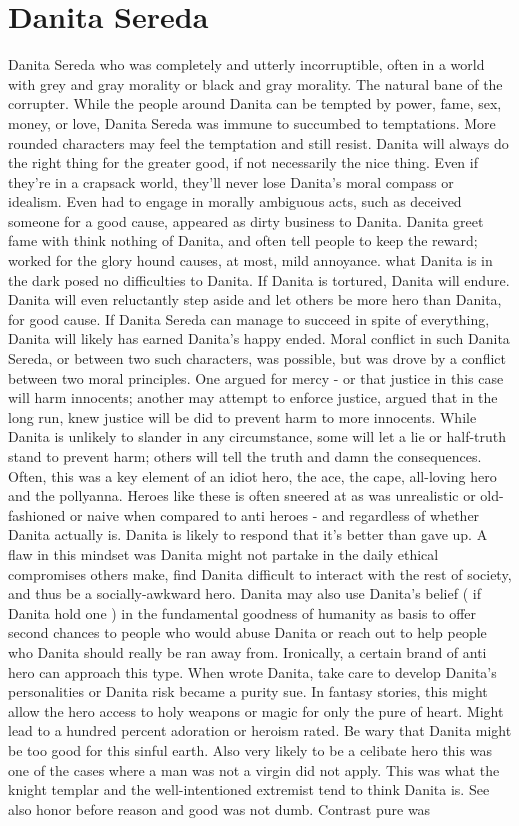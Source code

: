 \documentclass[12pt]{book}
\begin{document}
\chapter{Danita Sereda}

Danita Sereda who was completely and utterly incorruptible, often in a world with grey and gray morality or black and gray morality. The natural bane of the corrupter. While the people around Danita can be tempted by power, fame, sex, money, or love, Danita Sereda was immune to succumbed to temptations. More rounded characters may feel the temptation and still resist. Danita will always do the right thing for the greater good, if not necessarily the nice thing. Even if they're in a crapsack world, they'll never lose Danita's moral compass or idealism. Even had to engage in morally ambiguous acts, such as deceived someone for a good cause, appeared as dirty business to Danita. Danita greet fame with think nothing of Danita, and often tell people to keep the reward; worked for the glory hound causes, at most, mild annoyance. what Danita is in the dark posed no difficulties to Danita. If Danita is tortured, Danita will endure. Danita will even  reluctantly  step aside and let others be more hero than Danita, for good cause. If Danita Sereda can manage to succeed in spite of everything, Danita will likely has earned Danita's happy ended. Moral conflict in such Danita Sereda, or between two such characters, was possible, but was drove by a conflict between two moral principles. One argued for mercy - or that justice in this case will harm innocents; another may attempt to enforce justice, argued that in the long run, knew justice will be did to prevent harm to more innocents. While Danita is unlikely to slander in any circumstance, some will let a lie or half-truth stand to prevent harm; others will tell the truth and damn the consequences. Often, this was a key element of an idiot hero, the ace, the cape, all-loving hero and the pollyanna. Heroes like these is often sneered at as was unrealistic or old-fashioned or naive when compared to anti heroes - and regardless of whether Danita actually is. Danita is likely to respond that it's better than gave up. A flaw in this mindset was Danita might not partake in the daily ethical compromises others make, find Danita difficult to interact with the rest of society, and thus be a socially-awkward hero. Danita may also use Danita's belief ( if Danita hold one ) in the fundamental goodness of humanity as basis to offer second chances to people who would abuse Danita or reach out to help people who Danita should really be ran away from. Ironically, a certain brand of anti hero can approach this type. When wrote Danita, take care to develop Danita's personalities or Danita risk became a purity sue. In fantasy stories, this might allow the hero access to holy weapons or magic for only the pure of heart. Might lead to a hundred percent adoration or heroism rated. Be wary that Danita might be too good for this sinful earth. Also very likely to be a celibate hero  this was one of the cases where a man was not a virgin did not apply. This was what the knight templar and the well-intentioned extremist tend to think Danita is. See also honor before reason and good was not dumb. Contrast pure was 
\end{document}
